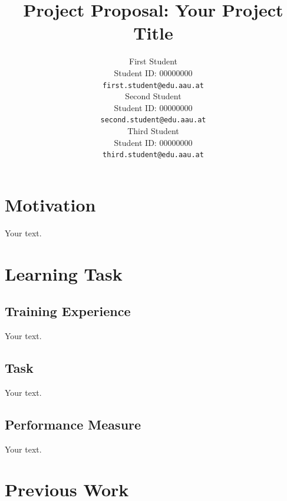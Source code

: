 \documentclass{article}
\title{Project Proposal: Your Project Title}
\author{%
  First Student \\
  Student ID: 00000000 \\
  \texttt{first.student@edu.aau.at} \\
  \And
  Second Student \\
  Student ID: 00000000 \\
  \texttt{second.student@edu.aau.at} \\
  \And
  Third Student \\
  Student ID: 00000000 \\
  \texttt{third.student@edu.aau.at} \\
}
\begin{document}
\maketitle

\section{Motivation}

Your text.

\section{Learning Task}

\subsection{Training Experience}

Your text.

\subsection{Task}

Your text.

\subsection{Performance Measure}

Your text.

\section{Previous Work}
\end{document}
